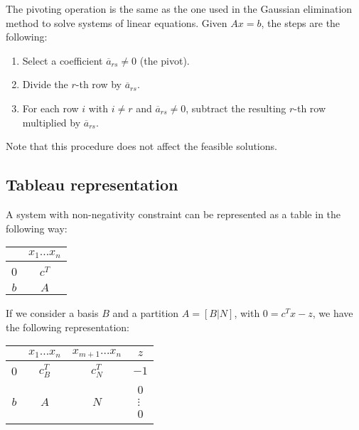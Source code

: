 The pivoting operation is the same as the one used in the Gaussian elimination method to solve systems of linear equations. Given $Ax=b$, the steps are the following: 
\begin{enumerate}
    \item Select a coefficient $\overline{a}_{rs} \neq 0$ (the pivot). 
    \item Divide the $r$-th row by $\overline{a}_{rs}$. 
    \item For each row $i$ with $i \neq r$ and $\overline{a}_{rs} \neq 0$, subtract the resulting $r$-th row multiplied by $\overline{a}_{rs}$. 
\end{enumerate}
Note that this procedure does not affect the feasible solutions. 

\subsection*{Tableau representation}
A system with non-negativity constraint can be represented as a table in the following way: 
\begin{table}[H]
    \centering
    \begin{tabular}{cc}
                              & $x_1 \dots x_n$            \\ \hline
    \multicolumn{1}{|c|}{0}   & \multicolumn{1}{c|}{$c^T$} \\ \hline
    \multicolumn{1}{|c|}{$b$} & \multicolumn{1}{c|}{$A$}   \\ \hline
    \end{tabular}
\end{table}
If we consider a basis $B$ and a partition $A=\left[B|N\right]$, with $0=c^Tx-z$, we have the following representation: 
\begin{table}[H]
    \centering
    \begin{tabular}{cccc}
                              & $x_1 \dots x_n$              & $x_{m+1}\dots x_n$           & $z$                                                                                                                                                                      \\ \hline
    \multicolumn{1}{|c|}{0}   & \multicolumn{1}{c|}{$c^T_B$} & \multicolumn{1}{c|}{$c^T_N$} & \multicolumn{1}{c|}{$-1$}                                                                                                                                                \\ \hline
    \multicolumn{1}{|c|}{$b$} & \multicolumn{1}{c|}{$A$}     & \multicolumn{1}{c|}{$N$}     & \multicolumn{1}{c|}{$\begin{matrix}0\\\vdots\\0\end{matrix}$} \\ \hline
    \end{tabular}
\end{table}
